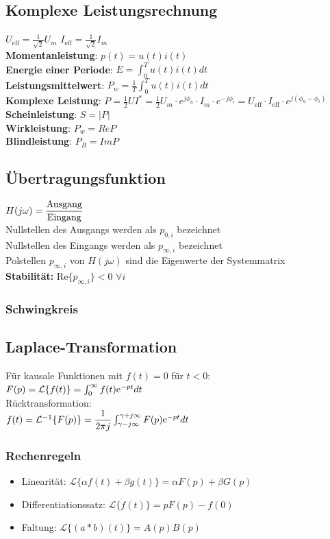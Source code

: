 \documentclass[fs, footer]{latex4ei}
\begin{document}
\begin{multicols*}{4}
{	\subsection{Komplexe Leistungsrechnung}
	$U_{\text{eff}} = \frac{1}{\sqrt{2}}U_m$\quad
	$I_{\text{eff}} = \frac{1}{\sqrt{2}}I_m$\\
	\textbf{Momentanleistung}: $p(t) = u(t)i(t)$\\
	\textbf{Energie einer Periode}: $E=\int_0^Tu(t)i(t)dt$\\
	\textbf{Leistungsmittelwert}: $P_w = \frac{1}{T} \int_0^T u(t)i(t)dt$\\
	\textbf{Komplexe Leistung}: $P = \frac{1}{2}UI^* = \frac{1}{2}U_m\cdot e^{j\phi_u}\cdot I_m\cdot e^{-j\phi_i} = U_{\text{eff}}\cdot I_{\text{eff}}\cdot e^{j(\phi_u-\phi_i)}$\\
	\textbf{Scheinleistung}: $S = |P|$\\
	\textbf{Wirkleistung}: $P_w = Re{P}$\\
	\textbf{Blindleistung}: $P_B = Im{P}$
}
\subsection{Übertragungsfunktion}
$H(j\omega ) = \dfrac{\text{Ausgang}}{\text{Eingang}}$\\
Nullstellen des Ausgangs werden als $p_{0,i}$ bezeichnet\\
Nullstellen des Eingangs werden als $p_{\infty,i}$ bezeichnet\\
Polstellen $p_{\infty, i}$ von $H(j\omega)$ sind die Eigenwerte der Systemmatrix\\
\textbf{Stabilität:} Re$\{p_{\infty,i}\} < 0$ \quad $\forall i$\\
\subsubsection{Schwingkreis}
\subsection{Laplace-Transformation}
Für kausale Funktionen mit $f(t) = 0$ für $t < 0$:\\
$F(p) = \mathcal L\{f(t)\} = \int_0^\infty f(t) \mathrm{e}^{-pt}dt$\\
Rücktransformation: \\
$f(t) = \mathcal L^{-1}\{F(p)\} = \dfrac{1}{2\pi j}\int_{\gamma-j\infty}^{\gamma+j\infty} F(p) \mathrm{e}^{-pt}dt$\\
\subsubsection{Rechenregeln}
\begin{itemize}
	\item Linearität: $\mathcal L\{\alpha f(t) + \beta g(t)\} = \alpha F(p) + \beta G(p)$
	\item Differentiationssatz: $\mathcal L\{\dot f(t)\} = pF(p) - f(0)$
	\item Faltung: $\mathcal L\{(a * b)(t)\} = A(p)B(p)$
\end{itemize}

\end{multicols*}
\end{document}
